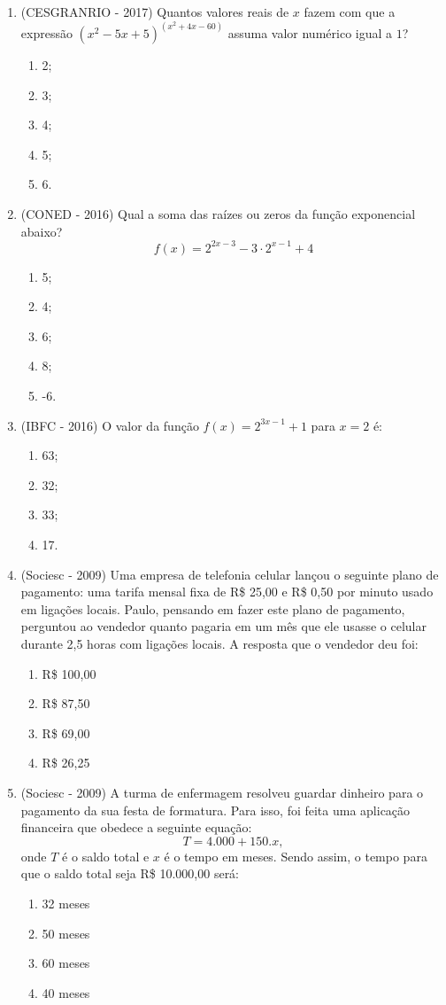 \begin{enumerate}
\item (CESGRANRIO - 2017) Quantos valores reais de $x$ fazem com que a expressão $(x^2 - 5x + 5)^{(x^2 + 4x - 60)}$ assuma valor numérico igual a $1$?
\begin{enumerate}
\item 2;
\item 3;
\item 4;
\item 5;
\item 6.
\end{enumerate}

\item (CONED - 2016) Qual a soma das raízes ou zeros da função exponencial abaixo?
\[f(x)= 2^{2x-3} - 3 \cdot 2^{x-1} + 4\]

\begin{enumerate}
\item 5;
\item 4;
\item 6;
\item 8;
\item -6.
\end{enumerate}

\item (IBFC - 2016) O valor da função $f(x) = 2^{3x-1} + 1$ para $x = 2$ é:
\begin{enumerate}
\item 63;
\item 32;
\item 33;
\item 17.
\end{enumerate}

 \item (Sociesc - 2009) Uma empresa de telefonia celular lançou o seguinte plano de pagamento: uma tarifa mensal fixa de R\$ 25,00 e R\$ 0,50 por minuto usado em ligações locais. Paulo, pensando em fazer este
 plano de pagamento, perguntou ao vendedor quanto pagaria em um mês que ele usasse o celular durante 2,5 horas com ligações locais. A
 resposta que o vendedor deu foi:
 \begin{enumerate}
  \item R\$ 100,00
  \item R\$ 87,50
  \item R\$ 69,00
  \item R\$ 26,25
 \end{enumerate}

 \item (Sociesc - 2009) A turma de enfermagem resolveu guardar dinheiro para o pagamento da sua festa de formatura. Para isso, foi feita uma aplicação financeira que obedece a seguinte equação:
  \[T = 4.000 + 150.x ,\]
  onde $T$ é o saldo total e $x$ é o tempo em meses. Sendo assim, o tempo para que o saldo total seja R\$ 10.000,00 será:
  \begin{enumerate}
  \item 32 meses
  \item 50 meses
  \item 60 meses
  \item 40 meses
 \end{enumerate}


\end{enumerate}
